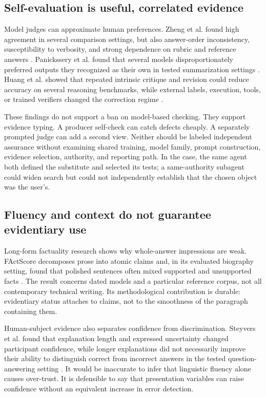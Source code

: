 \documentclass[10pt,a4paper]{article}
\begin{document}
\subsection{Self-evaluation is useful, correlated evidence}

Model judges can approximate human preferences. Zheng et al. found high agreement in several comparison settings, but also answer-order inconsistency, susceptibility to verbosity, and strong dependence on rubric and reference answers \cite{zheng2023}. Panickssery et al. found that several models disproportionately preferred outputs they recognized as their own in tested summarization settings \cite{panickssery2024}. Huang et al. showed that repeated intrinsic critique and revision could reduce accuracy on several reasoning benchmarks, while external labels, execution, tools, or trained verifiers changed the correction regime \cite{huang2024}.

These findings do not support a ban on model-based checking. They support evidence typing. A producer self-check can catch defects cheaply. A separately prompted judge can add a second view. Neither should be labeled independent assurance without examining shared training, model family, prompt construction, evidence selection, authority, and reporting path. In the case, the same agent both defined the substitute and selected its tests; a same-authority subagent could widen search but could not independently establish that the chosen object was the user's.

\subsection{Fluency and context do not guarantee evidentiary use}

Long-form factuality research shows why whole-answer impressions are weak. FActScore decomposes prose into atomic claims and, in its evaluated biography setting, found that polished sentences often mixed supported and unsupported facts \cite{factscore}. The result concerns dated models and a particular reference corpus, not all contemporary technical writing. Its methodological contribution is durable: evidentiary status attaches to claims, not to the smoothness of the paragraph containing them.

Human-subject evidence also separates confidence from discrimination. Steyvers et al. found that explanation length and expressed uncertainty changed participant confidence, while longer explanations did not necessarily improve their ability to distinguish correct from incorrect answers in the tested question-answering setting \cite{steyvers2025}. It would be inaccurate to infer that linguistic fluency alone causes over-trust. It is defensible to say that presentation variables can raise confidence without an equivalent increase in error detection.
\end{document}
